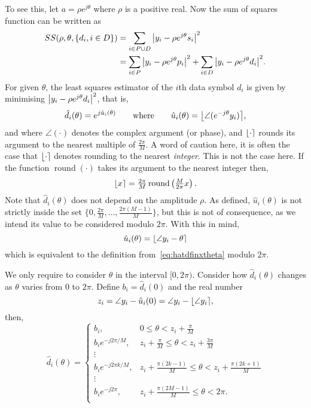 \documentclass[journal]{IEEEtran}
\begin{document}
To see this, let $a = \rho e^{j\theta}$ where $\rho$ is a positive real.  Now the sum of squares function can be written as
\begin{align*}
SS(\rho, \theta, \{d_i, i \in D\}) &= \sum_{i \in P \cup D} {\left|  y_i - \rho e^{j\theta} s_i  \right|}^2  \\
&= \sum_{i \in P} {\left|  y_i - \rho e^{j\theta} p_i  \right|}^2 + \sum_{i \in D} {\left|  y_i - \rho e^{j\theta} d_i  \right|}^2.
\end{align*}
For given $\theta$, the least squares estimator of the $i$th data symbol $d_i$ is given by minimising ${\left|  y_i - \rho e^{j\theta} d_i  \right|}^2$, that is,
\begin{equation}\label{eq:hatdfinxtheta}
\hat{d}_i(\theta) = e^{j\hat{u}_i(\theta)} \qquad \text{where} \qquad \hat{u}_i(\theta) = {\left\lfloor \angle( e^{-j\theta}y_i) \right\rceil},
\end{equation}
and where $\angle(\cdot)$ denotes the complex argument (or phase), and ${\left\lfloor \cdot \right\rceil}$ rounds its argument to the nearest multiple of $\frac{2\pi}{M}$.  A word of caution here, it is often the case that ${\left\lfloor \cdot \right\rceil}$ denotes rounding to the nearest \emph{integer}.  This is not the case here.  If the function $\operatorname{round}(\cdot)$ takes its argument to the nearest integer then,
\[
{\left\lfloor x \right\rceil} = \tfrac{2\pi}{M}\operatorname{round}\left(\tfrac{M}{2\pi}x\right).
\] 
Note that $\hat{d}_i(\theta)$ does not depend on the amplitude $\rho$.  As defined, $\hat{u}_i(\theta)$ is not strictly inside the set $\{0, \tfrac{2\pi}{M}, \dots, \tfrac{2\pi(M-1)}{M}\}$, but this is not of consequence, as we intend its value to be considered modulo $2\pi$.  With this in mind,
\[
\hat{u}_i(\theta) = {\left\lfloor \angle{y_i} - \theta  \right\rceil}
\]
which is equivalent to the definition from~\eqref{eq:hatdfinxtheta} modulo $2\pi$.

We only require to consider $\theta$ in the interval $[0, 2\pi)$.  Consider how $\hat{d}_i(\theta)$ changes as $\theta$ varies from $0$ to $2\pi$.  Define $b_i = \hat{d}_i(0)$ and the real number 
\[
z_i = \angle{y_i} - \hat{u}_i(0) = \angle{y_i} - {\left\lfloor \angle{y_i} \right\rceil},
\]
then,
\begin{equation}\label{eq:uicombos}
\hat{d}_i(\theta) = 
\begin{cases}
b_i, &  0 \leq \theta < z_i + \frac{\pi}{M} \\
b_i e^{-j2\pi/M}, & z_i + \frac{\pi}{M} \leq \theta < z_i + \frac{3\pi}{M} \\ 
\vdots & \\
b_i e^{-j2\pi k /M}, & z_i + \frac{\pi(2k - 1)}{M} \leq \theta < z_i + \frac{\pi(2k + 1)}{M}  \\ 
\vdots & \\
b_i e^{-j2\pi}, &  z_i + \frac{\pi(2M - 1)}{M} \leq \theta < 2\pi. \\
\end{cases}
\end{equation}
\end{document}
